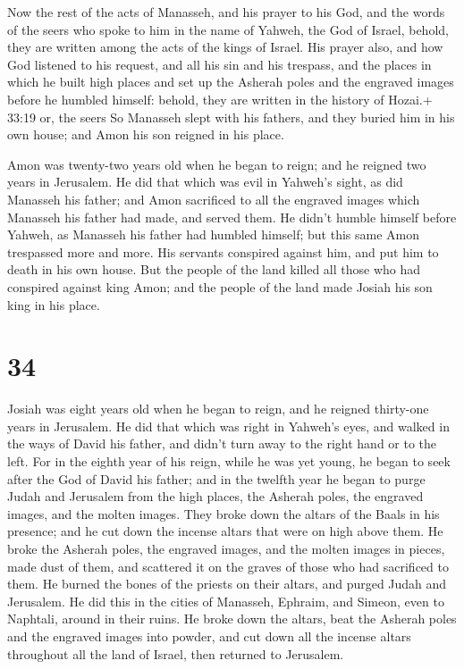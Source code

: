  Now the rest of the acts of Manasseh, and his prayer to
his God, and the words of the seers who spoke to him in the name of
Yahweh, the God of Israel, behold, they are written among the acts of
the kings of Israel.  His prayer also, and how God listened
to his request, and all his sin and his trespass, and the places in
which he built high places and set up the Asherah poles and the engraved
images before he humbled himself: behold, they are written in the
history of Hozai.+ 33:19 or, the seers  So Manasseh slept
with his fathers, and they buried him in his own house; and Amon his son
reigned in his place.

 Amon was twenty-two years old when he began to reign; and
he reigned two years in Jerusalem.  He did that which was
evil in Yahweh's sight, as did Manasseh his father; and Amon sacrificed
to all the engraved images which Manasseh his father had made, and
served them.  He didn't humble himself before Yahweh, as
Manasseh his father had humbled himself; but this same Amon trespassed
more and more.  His servants conspired against him, and put
him to death in his own house.  But the people of the land
killed all those who had conspired against king Amon; and the people of
the land made Josiah his son king in his place.

\hypertarget{section-33}{%
\section{34}\label{section-33}}

 Josiah was eight years old when he began to reign, and he
reigned thirty-one years in Jerusalem.  He did that which
was right in Yahweh's eyes, and walked in the ways of David his father,
and didn't turn away to the right hand or to the left.  For
in the eighth year of his reign, while he was yet young, he began to
seek after the God of David his father; and in the twelfth year he began
to purge Judah and Jerusalem from the high places, the Asherah poles,
the engraved images, and the molten images.  They broke down
the altars of the Baals in his presence; and he cut down the incense
altars that were on high above them. He broke the Asherah poles, the
engraved images, and the molten images in pieces, made dust of them, and
scattered it on the graves of those who had sacrificed to them.
 He burned the bones of the priests on their altars, and
purged Judah and Jerusalem.  He did this in the cities of
Manasseh, Ephraim, and Simeon, even to Naphtali, around in their ruins.
 He broke down the altars, beat the Asherah poles and the
engraved images into powder, and cut down all the incense altars
throughout all the land of Israel, then returned to Jerusalem.

